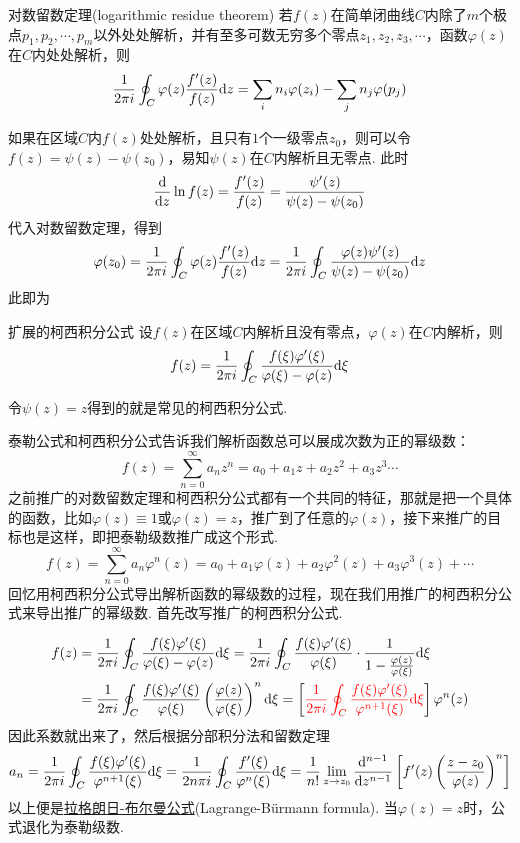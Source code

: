 \documentclass[main.tex]{subfiles}
\begin{document}
\begin{theorem}{对数留数定理(logarithmic residue theorem)}
    若\(f(z)\)在简单闭曲线\(C\)内除了\(m\)个极点\(p_1, p_2, \cdots, p_m\)以外处处解析，并有至多可数无穷多个零点\(z_1, z_2, z_3, \cdots\)，函数\(\varphi(z)\)在\(C\)内处处解析，则
    \[\frac{1}{2\pi i}\oint_{C}\varphi(z)\frac{f'(z)}{f(z)}{\rm d}z = \sum_{i}n_i\varphi(z_i) - \sum_{j}n_j\varphi(p_j)\]
\end{theorem}

如果在区域\(C\)内\(f(z)\)处处解析，且只有\(1\)个一级零点\(z_0\)，则可以令\(f(z)=\psi(z)-\psi(z_0)\)，易知\(\psi(z)\)在\(C\)内解析且无零点. 此时
\[\frac{{\rm d}}{{\rm d}z}\ln f(z) = \frac{f'(z)}{f(z)}=\frac{\psi'(z)}{\psi(z)-\psi(z_0)}\]
代入对数留数定理，得到
\[\varphi(z_0) = \frac{1}{2\pi i}\oint_C \varphi(z)\frac{f'(z)}{f(z)}{\rm d}z = \frac{1}{2\pi i}\oint_C\frac{\varphi(z)\psi'(z)}{\psi(z)-\psi(z_0)}{\rm d}z\]
此即为

\begin{theorem}{扩展的柯西积分公式}
    设\(f(z)\)在区域\(C\)内解析且没有零点，\(\varphi(z)\)在\(C\)内解析，则
    \[f(z)=\frac{1}{2 \pi i}\oint_C\frac{f(\xi)\varphi'(\xi)}{\varphi(\xi)-\varphi(z)}{\rm d}\xi\]
\end{theorem}
令\(\psi(z)=z\)得到的就是常见的柯西积分公式.

泰勒公式和柯西积分公式告诉我们解析函数总可以展成次数为正的幂级数：
\[f(z) = \sum_{n=0}^{\infty} a_nz^n = a_0 + a_1z + a_2z^2 + a_3z^3\cdots\]
之前推广的对数留数定理和柯西积分公式都有一个共同的特征，那就是把一个具体的函数，比如\(\varphi(z) \equiv 1\)或\(\varphi(z) = z\)，推广到了任意的\(\varphi(z)\)，接下来推广的目标也是这样，即把泰勒级数推广成这个形式.
\[f(z) = \sum_{n=0}^{\infty} a_n\varphi^n(z) = a_0 + a_1\varphi(z) + a_2\varphi^2(z) + a_3\varphi^3(z) + \cdots\]
回忆用柯西积分公式导出解析函数的幂级数的过程，现在我们用推广的柯西积分公式来导出推广的幂级数. 首先改写推广的柯西积分公式.

\begin{align*}
    f(z) &= \frac{1}{2 \pi i}\oint_C\frac{f(\xi)\varphi'(\xi)}{\varphi(\xi)-\varphi(z)}{\rm d}\xi
    = \frac{1}{2\pi i}\oint_C\frac{f(\xi)\varphi'(\xi)}{\varphi(\xi)}\cdot\frac{1}{1-\frac{\varphi(z)}{\varphi(\xi)}}{\rm d}\xi \\
    &= \frac{1}{2\pi i}\oint_C\frac{f(\xi)\varphi'(\xi)}{\varphi(\xi)}\left(\frac{\varphi(z)}{\varphi(\xi)}\right)^n{\rm d}\xi 
    = \left[{\color{red} \frac{1}{2\pi i}\oint_C\frac{f(\xi)\varphi'(\xi)}{\varphi^{n+1}(\xi)}{\rm d}\xi}\right]\varphi^n(z)
\end{align*}
因此系数就出来了，然后根据分部积分法和留数定理
\[a_n = \frac{1}{2\pi i}\oint_C\frac{f(\xi)\varphi'(\xi)}{\varphi^{n+1}(\xi)}{\rm d}\xi = \frac{1}{2n\pi i}\oint_C\frac{f'(\xi)}{\varphi^{n}(\xi)}{\rm d}\xi = \frac{1}{n!}\lim_{z \to z_0}\frac{{\rm d}^{n-1}}{{\rm d}z^{n-1}}\left[f'(z)\left(\frac{z-z_0}{\varphi(z)}\right)^n\right]\]
以上便是\uline{拉格朗日-布尔曼公式}(Lagrange-Bürmann formula). 当\(\varphi(z)=z\)时，公式退化为泰勒级数.
\end{document}

